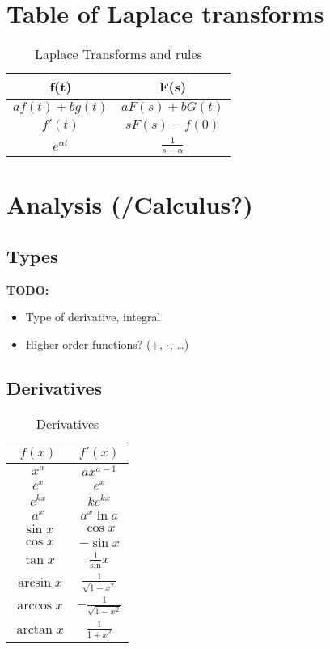 \section{Table of Laplace transforms}
\begin{table}[h!]
    \centering
    \caption{Laplace Transforms and rules}
\begin{tabular}{|c | c|}
    \hline 
     f(t) & F(s) \\
    \hline 
     $a f(t) + b g(t)$ & $a F(s) + b G(t)$\\
     \hline 
     $f'(t)$ & $s F(s) - f(0)$ \\
     \hline 
     $e^{\alpha t}$ & $\frac{1}{s-\alpha}$\\
     \hline 
\end{tabular}
    \label{tab:laplacetrans}
\end{table}


\section{Analysis (/Calculus?)} 
\subsection{Types}
\textbf{TODO:} 
\begin{itemize}
    \item Type of derivative, integral 
    \item Higher order functions? (+, $\cdot$, \dots)
\end{itemize}

\subsection{Derivatives}

\begin{table}[h!]
    \centering
    \caption{Derivatives}
    \begin{tabular}{|c|c|}
    \hline 
         $f(x)$ & $f'(x)$ \\
    \hline 
         $x^a$ & $ax^{a-1}$ \\
         $e^x$ & $e^x$ \\
         $e^{kx}$ & $ke^{kx}$ \\
         $a^{x}$ & $a^x \ln a $ \\
         $\sin x$ & $\cos x$ \\
         $\cos x$ & $-\sin x$ \\
         $\tan x$ & $\frac{1}{\sin} x$ \\
         $\arcsin x$ & $\frac{1}{\sqrt{1-x^2}}$ \\
         $\arccos x$ & $-\frac{1}{\sqrt{1-x^2}}$\\
         $\arctan x$ & $\frac{1}{1+x^2}$
         \\ \hline
    \end{tabular}
    \label{tab:derivatives}
\end{table}

